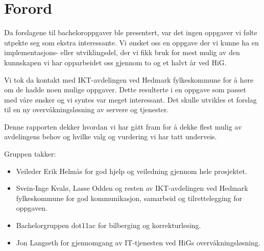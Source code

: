 \chapter*{Forord}
Da forslagene til bacheloroppgaver ble presentert, var det ingen oppgaver vi følte utpekte seg som ekstra interessante. Vi ønsket oss en oppgave der vi kunne ha en implementasjons- eller utviklingsdel, der vi fikk bruk for mest mulig av den kunnskapen vi har opparbeidet oss gjennom to og et halvt år ved HiG. 

Vi tok da kontakt med IKT-avdelingen ved Hedmark fylkeskommune for å høre om de hadde noen mulige oppgaver. Dette resulterte i en oppgave som passet med våre ønsker og vi syntes var meget interessant. Det skulle utvikles et forslag til en ny overvåkningsløsning av servere og tjenester. 

Denne rapporten dekker hvordan vi har gått fram for å dekke flest mulig av avdelingens behov og hvilke valg og vurdering vi har tatt underveis.
 
Gruppen takker:
\begin{itemize} 
\item Veileder Erik Helmås for god hjelp og veiledning gjennom hele prosjektet.
\item Svein-Inge Kvalø, Lasse Odden og resten av IKT-avdelingen ved Hedmark fylkeskommune for god kommunikasjon, samarbeid og tilrettelegging for oppgaven.
\item Bachelorgruppen dot11ac for bilberging og korrekturlesing.
\item Jon Langseth for gjennomgang av IT-tjenesten ved HiGs overvåkningsløsning.
\end{itemize}

